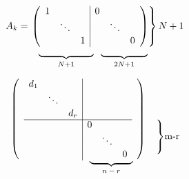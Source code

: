 \documentclass[12pt]{article}
\newcommand\undermat[2]{%
	\makebox[0pt][l]{$\smash{\underbrace{\phantom{%
					\begin{matrix}#2\end{matrix}}}_{\text{$#1$}}}$}#2}
\begin{document}
\begin{align*}
A_{k} &= \left.\left(
\begin{array}{ccc|ccc}
1 &  &  & 0\\
 & \ddots &  &  & \ddots\\
 &  & 1 &  &  & 0
\end{array}
\right)\right\}N+1\\[-0.5\normalbaselineskip]
      & \hspace{2em}\underbrace{\hspace{2cm}}_{N+1} 
        \hspace{\tabcolsep}
        \underbrace{\hspace{1.7cm}}_{2N+1}
 \end{align*}
 
\begin{align}
 	\begin{array}{cccc|ccccc}
 	\ldelim({7}{*} &d_1 &&&&&& \rdelim){7}{*}& \\
 	&& \ddots &&&&&& \\
 	&& & d_r &&&&&\\ \cline{2-7}
 	&&&& 0&&&& \rdelim\}{3}{*}[m-r] \\
 	&&&&& \ddots&&& \\
 	&&&& \undermat{n-r}{&& 0&&}
 	\end{array}
\end{align}
 

 
\end{document}
